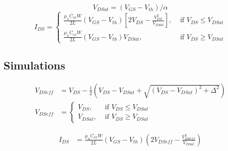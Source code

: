 \documentclass{article}
\begin{document}
\begin{equation}
    V_{DSat} = (V_{GS} - V_{th})/\alpha 
\end{equation}
\begin{equation}
    I_{DS} = \begin{cases}
        \frac{\mu_n C_{ox} W}{2L} (V_{GS}-V_{th}) \left[ 2V_{DS} - \frac{V_{DS}^2}{V_{DSat}}\right], & \text{ if } V_{DS}\leq V_{DSat} \\
        \frac{\mu_n C_{ox} W}{2L} (V_{GS}-V_{th}) V_{DSat}, & \text { if } V_{DS} \geq V_{DSat}
    \end{cases} 
\end{equation}

\subsection*{Simulations}

\begin{align}
        V_{DSeff} &= V_{DS} -  \frac{1}{2}(V_{DS}-V_{DSat}+\sqrt{(V_{DS}-V_{DSat})^2 + \Delta^2}) \\
        V_{DSeff} &= \begin{cases}
        V_{DS}, & \text{ if } V_{DS}\leq V_{DSat} \\
        V_{DSat}, & \text { if } V_{DS} \geq V_{DSat}
        \end{cases}
\end{align}

\begin{align} 
    \label{eq:DrainCurrent}
    I_{DS} &= \frac{\mu_n C_{ox} W}{2L}(V_{GS}-V_{th}) \left(2V_{DSeff} - \frac{V_{DSeff}^2}{V_{DSat}}\right)
\end{align}

\newpage
\end{document}
